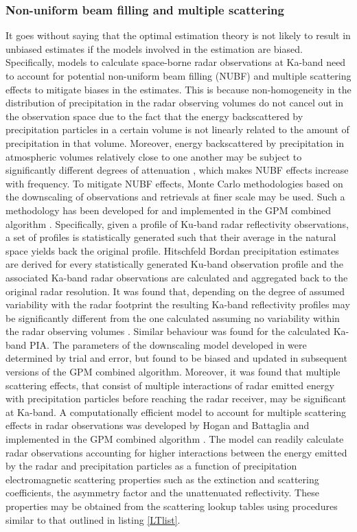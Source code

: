\documentclass[10pt]{ietbook}
\begin{document}
\subsubsection{Non-uniform beam filling and multiple scattering}
It goes without saying that the optimal estimation theory is not likely to result in unbiased estimates if the models involved in the estimation are biased. 
Specifically, models to calculate space-borne radar observations at Ka-band need to account for potential non-uniform beam filling (NUBF) and multiple scattering 
effects to mitigate biases in the estimates. This is because non-homogeneity in the distribution of precipitation in the radar observing volumes do not
cancel out in the observation space due to the fact that the energy backscattered by precipitation particles in a certain volume is not linearly related
to the amount of precipitation in that volume.  Moreover, energy backscattered by precipitation in atmospheric volumes relatively close to one another may 
be subject to significantly different degrees of attenuation \cite{iguchi2009}, which makes NUBF effects increase with frequency.  To mitigate NUBF effects,
Monte Carlo methodologies based on the downscaling of observations and retrievals at finer scale may be used. Such a methodology has been developed for 
and implemented in the GPM combined algorithm \cite{grecu2016}. Specifically, given a profile of Ku-band radar reflectivity observations, a set of profiles is 
statistically generated such that their average in the natural space yields back the original profile. Hitschfeld Bordan precipitation estimates are derived for 
every statistically generated Ku-band observation profile and the associated Ka-band radar observations are calculated and aggregated back to the original
radar resolution. It was found that, depending on the degree of assumed variability with the radar footprint the resulting Ka-band reflectivity profiles may
be significantly different from the one calculated assuming no variability within the radar observing volumes \cite{grecu2016}.  Similar behaviour was found
for the calculated Ka-band PIA.  The parameters of the downscaling model developed in \cite{grecu2016} were determined by trial and error, but found to be biased
and updated in subsequent versions of the GPM combined algorithm.  Moreover, it was found that multiple scattering effects, that consist of multiple interactions of radar emitted energy
with precipitation particles before reaching the radar receiver, may be significant at Ka-band. A computationally efficient model to account for
multiple scattering effects in radar observations was developed by Hogan and Battaglia \cite{hogan2008} and implemented in the GPM combined algorithm
\cite{grecu2016}.  The model can readily calculate radar
observations accounting for higher interactions between the energy emitted by the radar and precipitation particles as a function of
precipitation electromagnetic scattering properties such as the extinction and scattering coefficients, the asymmetry factor and the 
unattenuated reflectivity. These properties may be obtained from the scattering lookup tables using procedures similar to that outlined in listing \ref{LTlist}.
\end{document}
